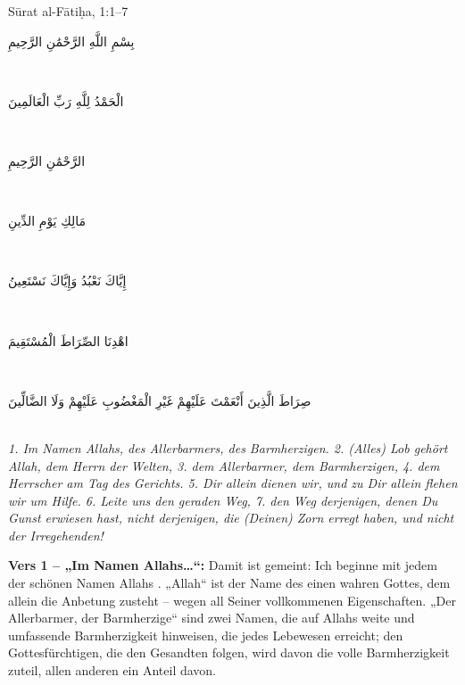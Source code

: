 \begin{quranvers}{Sūrat al-Fātiḥa, 1:1--7}
{\quranfont\begin{Arabic}
بِسْمِ اللَّهِ الرَّحْمَٰنِ الرَّحِيمِ
\end{Arabic}}\\[2mm]
{\quranfont\begin{Arabic}
الْحَمْدُ لِلَّهِ رَبِّ الْعَالَمِينَ
\end{Arabic}}\\[2mm]
{\quranfont\begin{Arabic}
الرَّحْمَٰنِ الرَّحِيمِ
\end{Arabic}}\\[2mm]
{\quranfont\begin{Arabic}
مَالِكِ يَوْمِ الدِّينِ
\end{Arabic}}\\[2mm]
{\quranfont\begin{Arabic}
إِيَّاكَ نَعْبُدُ وَإِيَّاكَ نَسْتَعِينُ
\end{Arabic}}\\[2mm]
{\quranfont\begin{Arabic}
اهْدِنَا الصِّرَاطَ الْمُسْتَقِيمَ
\end{Arabic}}\\[2mm]
{\quranfont\begin{Arabic}
صِرَاطَ الَّذِينَ أَنْعَمْتَ عَلَيْهِمْ غَيْرِ الْمَغْضُوبِ عَلَيْهِمْ وَلَا الضَّالِّينَ
\end{Arabic}}\\[3mm]
\emph{1. Im Namen Allahs, des Allerbarmers, des Barmherzigen. 2. (Alles) Lob gehört Allah, dem
Herrn der Welten, 3. dem Allerbarmer, dem Barmherzigen, 4. dem Herrscher am Tag des
Gerichts. 5. Dir allein dienen wir, und zu Dir allein flehen wir um Hilfe. 6. Leite uns den geraden
Weg, 7. den Weg derjenigen, denen Du Gunst erwiesen hast, nicht derjenigen, die (Deinen) Zorn
erregt haben, und nicht der Irregehenden!}
\end{quranvers}

\textbf{Vers 1 – „Im Namen Allahs\ldots{}“:} Damit ist gemeint: Ich beginne mit jedem der schönen
Namen Allahs . „Allah“ ist der Name des einen wahren Gottes, dem allein die Anbetung
zusteht – wegen all Seiner vollkommenen Eigenschaften. „Der Allerbarmer, der Barmherzige“
sind zwei Namen, die auf Allahs weite und umfassende Barmherzigkeit hinweisen, die jedes
Lebewesen erreicht; den Gottesfürchtigen, die den Gesandten folgen, wird davon die volle
Barmherzigkeit zuteil, allen anderen ein Anteil davon.


